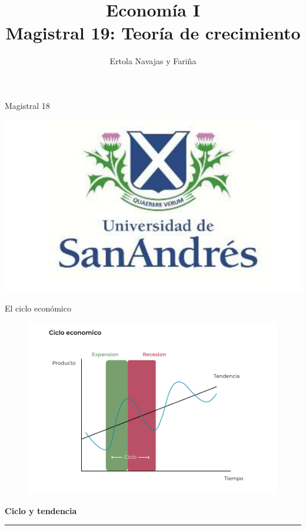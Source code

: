 \documentclass{beamer}
\title[Economía I]{Economía I \vspace{4mm}
\\ Magistral 19: Teoría de crecimiento }
\date{}
\author[Ertola Navajas y Fariña]{Ertola Navajas y Fariña}
\institute[]{Universidad de San Andrés}
\begin{document}
\begin{frame}
\titlepage
\centering
Magistral 18

\includegraphics[scale=0.2]{Slides Principios de Economia/Figures/logoUDESA.jpg} 
\end{frame}

\begin{frame}{El ciclo económico}
    \begin{figure} [H]   
\includegraphics[scale=0.75]{Slides Principios de Economia/Figures/32.7.pdf}
\label{fig:19.1}
\end{figure}

\end{frame}

\begin{frame}{}
\centering\huge\textbf{Ciclo y tendencia} 
\vspace{2mm}
\hrule
\end{frame}
\end{document}
